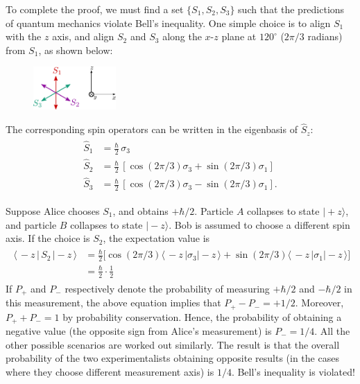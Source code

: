 \documentclass[pra,12pt]{revtex4}
\begin{document}
To complete the proof, we must find a set $\{S_1, S_2, S_3\}$ such
that the predictions of quantum mechanics violate Bell's inequality.
One simple choice is to align $S_1$ with the $z$ axis, and align $S_2$
and $S_3$ along the $x$-$z$ plane at $120^\circ$ ($2\pi/3$ radians)
from $S_1$, as shown below:

\begin{figure}[h]
  \centering\includegraphics[width=0.28\textwidth]{bellaxes}
\end{figure}

The corresponding spin operators can be written in the eigenbasis of
$\hat{S}_z$:
\begin{align}
  \begin{aligned}\hat{S}_1 &= \frac{\hbar}{2} \, \sigma_3 \\ \hat{S}_2 &= \frac{\hbar}{2} \, \left[\cos(2\pi/3) \sigma_3 + \sin(2\pi/3)\sigma_1\right]  \\   \hat{S}_3 &= \frac{\hbar}{2} \, \left[\cos(2\pi/3) \sigma_3 - \sin(2\pi/3)\sigma_1\right].\end{aligned}
\end{align}

Suppose Alice chooses $S_1$, and obtains $+\hbar/2$.  Particle $A$
collapses to state $|\!+\!z\rangle$, and particle $B$ collapses to
state $|\!-\!z\rangle$.  Bob is assumed to choose a different spin
axis.  If the choice is $S_2$, the expectation value is
\begin{align}
  \begin{aligned}\langle\, - z \, | \, S_2 \,|-\!z\,\rangle &= \frac{\hbar}{2} \Big[\cos(2\pi/3) \langle\,- z\,|\sigma_3| - \!z\,\rangle + \sin(2\pi/3)\langle\,- z\,|\sigma_1|-\!z\,\rangle\Big]\\ &= \frac{\hbar}{2} \cdot \frac{1}{2} \end{aligned}
\end{align}
If $P_+$ and $P_-$ respectively denote the probability of measuring
$+\hbar/2$ and $-\hbar/2$ in this measurement, the above equation
implies that $P_+ - P_- = + 1/2$.  Moreover, $P_+ + P_- = 1$ by
probability conservation.  Hence, the probability of obtaining a
negative value (the opposite sign from Alice's measurement) is $P_- =
1/4$.  All the other possible scenarios are worked out similarly.  The
result is that the overall probability of the two experimentalists
obtaining opposite results (in the cases where they choose different
measurement axis) is $1/4$.  Bell's inequality is violated!
\end{document}
